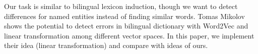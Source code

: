 Our task is similar to bilingual lexicon induction,
though we want to detect differences for named entities instead of
finding similar words. Tomas Mikolov~\cite{Mikolov:2013tp}
shows the potential to detect errors
in bilingual dictionary with Word2Vec and linear transformation among
different vector spaces. In this paper, we implement their idea
(linear transformation) and compare with ideas of ours.
